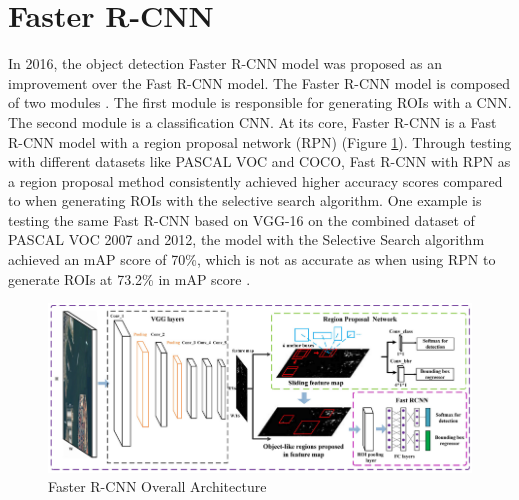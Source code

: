 \section{Faster R-CNN}  \label{sec:faster_rcnn}

In 2016, the object detection Faster R-CNN model was proposed as an improvement over the Fast R-CNN model. The Faster R-CNN model is composed of two modules . The first module is responsible for generating ROIs with a CNN. The second module is a classification CNN. At its core, Faster R-CNN is a Fast R-CNN model with a region proposal network (RPN) (Figure \ref{fig:faster_rcnn_archite}). Through testing with different datasets like PASCAL VOC and COCO, Fast R-CNN with RPN as a region proposal method consistently achieved higher accuracy scores compared to when generating ROIs with the selective search algorithm. One example is testing the same Fast R-CNN based on VGG-16 on the combined dataset of PASCAL VOC 2007 and 2012, the model with the Selective Search algorithm achieved an mAP score of 70\%, which is not as accurate as when using RPN to generate ROIs at 73.2\% in mAP score \cite{faster_rcnn_2015}.

\begin{figure}[!ht]
    \centering
    \includegraphics[width=5in]{figures/faster_rcnn_archite.png}
    \caption{Faster R-CNN Overall Architecture \cite{faster_rcnn_architecture_fig}} \label{fig:faster_rcnn_archite}
\end{figure}

